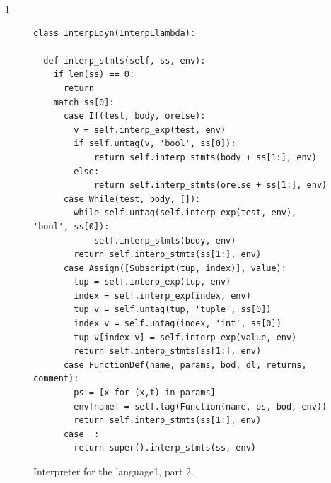 \documentclass[7x10]{TimesAPriori_MIT}%
\def\pythonEd{1}
\def\edition{0}
\newcommand{\python}[1]{{\if\edition\pythonEd #1\fi}}
\numberwithin{theorem}{chapter}
\numberwithin{definition}{chapter}
\numberwithin{equation}{chapter}
\begin{document}
{\if\edition\pythonEd
  \begin{figure}[tbp]
\begin{tcolorbox}[colback=white]    
\begin{lstlisting}[basicstyle=\ttfamily\footnotesize]
class InterpLdyn(InterpLlambda):
  
  def interp_stmts(self, ss, env):
    if len(ss) == 0:
      return
    match ss[0]:
      case If(test, body, orelse):
        v = self.interp_exp(test, env)
        if self.untag(v, 'bool', ss[0]):
            return self.interp_stmts(body + ss[1:], env)
        else:
            return self.interp_stmts(orelse + ss[1:], env)
      case While(test, body, []):
        while self.untag(self.interp_exp(test, env), 'bool', ss[0]):
            self.interp_stmts(body, env)
        return self.interp_stmts(ss[1:], env)
      case Assign([Subscript(tup, index)], value):
        tup = self.interp_exp(tup, env)
        index = self.interp_exp(index, env)
        tup_v = self.untag(tup, 'tuple', ss[0])
        index_v = self.untag(index, 'int', ss[0])
        tup_v[index_v] = self.interp_exp(value, env)
        return self.interp_stmts(ss[1:], env)
      case FunctionDef(name, params, bod, dl, returns, comment):
        ps = [x for (x,t) in params]
        env[name] = self.tag(Function(name, ps, bod, env))
        return self.interp_stmts(ss[1:], env)
      case _:
        return super().interp_stmts(ss, env)
\end{lstlisting}
\end{tcolorbox}

\caption{Interpreter for the \LangDyn{} language\python{, part 2}.}
\label{fig:interp-Ldyn-2}
\end{figure}
\fi}
\end{document}
